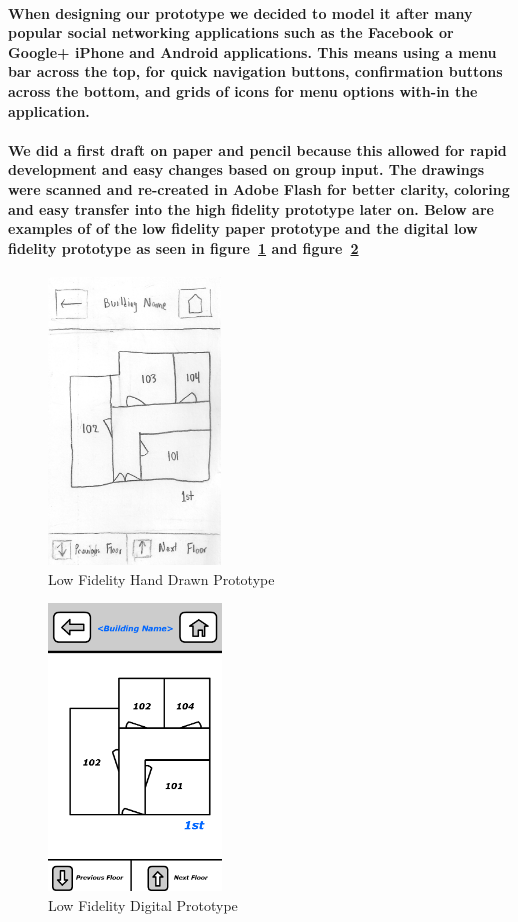 \documentclass{report}
\begin{document}
    \paragraph{When designing our prototype we decided to model it after many
    popular social networking applications such as the Facebook or Google+ iPhone
    and Android applications. This means using a menu bar across the top, for quick
    navigation buttons, confirmation buttons across the bottom, and grids of icons
    for menu options with-in the application.}
    \paragraph{We did a first draft on paper and pencil because this allowed for
    rapid development and easy changes based on group input. The drawings were
    scanned and re-created in Adobe Flash for better clarity, coloring and easy
    transfer into the high fidelity prototype later on. Below are examples of of the
    low fidelity paper prototype and the digital low fidelity prototype as seen
    in figure~\ref{fig:lfpaper} and figure~\ref{fig:lfdigital}}
    \begin{figure}
        \centering
            \includegraphics[height=3in]{img/figure431.png}
        \caption{Low Fidelity Hand Drawn Prototype}
        \label{fig:lfpaper}
    \end{figure}
    \begin{figure}
        \centering
            \includegraphics[height=3in]{img/figure432.png}
        \caption{Low Fidelity Digital Prototype}
        \label{fig:lfdigital}
    \end{figure}
\end{document}
